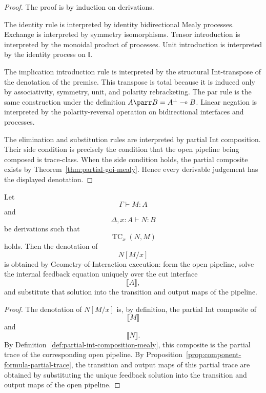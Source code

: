 \begin{proof}
The proof is by induction on derivations.

The identity rule is interpreted by identity bidirectional Mealy processes.
Exchange is interpreted by symmetry isomorphisms.  Tensor introduction is
interpreted by the monoidal product of processes.  Unit introduction is
interpreted by the identity process on \(\mathbb I\).

The implication introduction rule is interpreted by the structural
Int-transpose of the denotation of the premise.  This transpose is total
because it is induced only by associativity, symmetry, unit, and polarity
rebracketing.  The par rule is the same construction under the definition
\(A\parr B=A^\bot\multimap B\).  Linear negation is interpreted by the
polarity-reversal operation on bidirectional interfaces and processes.

The elimination and substitution rules are interpreted by partial Int
composition.  Their side condition is precisely the condition that the open
pipeline being composed is trace-class.  When the side condition holds, the
partial composite exists by Theorem~\ref{thm:partial-goi-mealy}.  Hence every
derivable judgement has the displayed denotation.
\end{proof}

\begin{theorem}
\label{thm:pml-cut-execution}
Let
\[
\Gamma\vdash M:A
\]
and
\[
\Delta,x:A\vdash N:B
\]
be derivations such that
\[
\operatorname{TC}_x(N,M)
\]
holds.  Then the denotation of
\[
N[M/x]
\]
is obtained by Geometry-of-Interaction execution: form the open pipeline,
solve the internal feedback equation uniquely over the cut interface
\[
\llbracket A\rrbracket,
\]
and substitute that solution into the transition and output maps of the
pipeline.
\end{theorem}

\begin{proof}
The denotation of \(N[M/x]\) is, by definition, the partial Int composite of
\[
\llbracket M\rrbracket
\]
and
\[
\llbracket N\rrbracket.
\]
By Definition~\ref{def:partial-int-composition-mealy}, this composite is the
partial trace of the corresponding open pipeline.  By
Proposition~\ref{prop:component-formula-partial-trace}, the transition and
output maps of this partial trace are obtained by substituting the unique
feedback solution into the transition and output maps of the open pipeline.
\end{proof}


